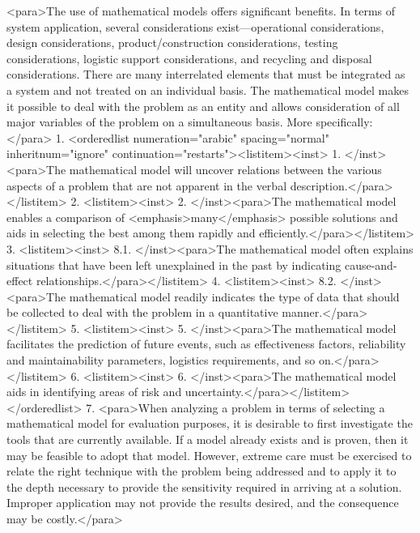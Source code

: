 <para>The use of mathematical models offers significant benefits. In terms of system application, several considerations exist—operational considerations, design considerations, product/construction considerations, testing considerations, logistic support considerations, and recycling and disposal considerations. There are many interrelated elements that must be integrated as a system and not treated on an individual basis. The mathematical model makes it possible to deal with the problem as an entity and allows consideration of all major variables of the problem on a simultaneous basis. More specifically:</para>
    1. <orderedlist numeration="arabic" spacing="normal" inheritnum="ignore" continuation="restarts"><listitem><inst>	1.	</inst><para>The mathematical model will uncover relations between the various aspects of a problem that are not apparent in the verbal description.</para></listitem>
    2. <listitem><inst>	2.	</inst><para>The mathematical model enables a comparison of <emphasis>many</emphasis> possible solutions and aids in selecting the best among them rapidly and efficiently.</para></listitem>
    3. <listitem><inst>	8.1.	</inst><para>The mathematical model often explains situations that have been left unexplained in the past by indicating cause-and-effect relationships.</para></listitem>
    4. <listitem><inst>	8.2.	</inst><para>The mathematical model readily indicates the type of data that should be collected to deal with the problem in a quantitative manner.</para></listitem>
    5. <listitem><inst>	5.	</inst><para>The mathematical model facilitates the prediction of future events, such as effectiveness factors, reliability and maintainability parameters, logistics requirements, and so on.</para></listitem>
    6. <listitem><inst>	6.	</inst><para>The mathematical model aids in identifying areas of risk and uncertainty.</para></listitem></orderedlist>
    7. <para>When analyzing a problem in terms of selecting a mathematical model for evaluation purposes, it is desirable to first investigate the tools that are currently available. If a model already exists and is proven, then it may be feasible to adopt that model. However, extreme care must be exercised to relate the right technique with the problem being addressed and to apply it to the depth necessary to provide the sensitivity required in arriving at a solution. Improper application may not provide the results desired, and the consequence may be costly.</para>
